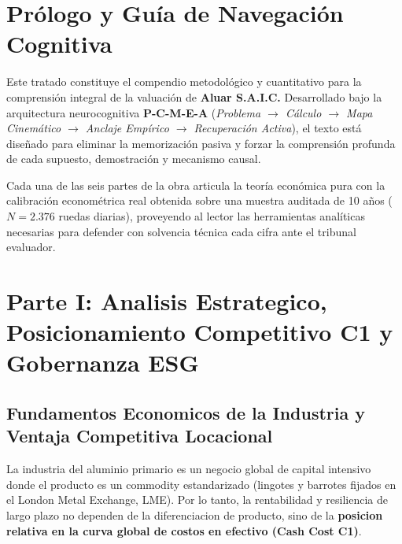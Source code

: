 \documentclass[10pt,a4paper]{article}
\theoremstyle{definition}
\begin{document}
\vspace{2.0cm}
\section*{Prólogo y Guía de Navegación Cognitiva}
Este tratado constituye el compendio metodológico y cuantitativo para la comprensión integral de la valuación de \textbf{Aluar S.A.I.C.} Desarrollado bajo la arquitectura neurocognitiva \textbf{P-C-M-E-A} (\textit{Problema $\to$ Cálculo $\to$ Mapa Cinemático $\to$ Anclaje Empírico $\to$ Recuperación Activa}), el texto está diseñado para eliminar la memorización pasiva y forzar la comprensión profunda de cada supuesto, demostración y mecanismo causal.

Cada una de las seis partes de la obra articula la teoría económica pura con la calibración econométrica real obtenida sobre una muestra auditada de 10 años ($N=2.376$ ruedas diarias), proveyendo al lector las herramientas analíticas necesarias para defender con solvencia técnica cada cifra ante el tribunal evaluador.

\clearpage

\tableofcontents
\clearpage

\section{Parte I: Analisis Estrategico, Posicionamiento Competitivo C1 y Gobernanza ESG}

\subsection{Fundamentos Economicos de la Industria y Ventaja Competitiva Locacional}
La industria del aluminio primario es un negocio global de capital intensivo donde el producto es un commodity estandarizado (lingotes y barrotes fijados en el London Metal Exchange, LME). Por lo tanto, la rentabilidad y resiliencia de largo plazo no dependen de la diferenciacion de producto, sino de la \textbf{posicion relativa en la curva global de costos en efectivo (Cash Cost C1)}.
\end{document}
